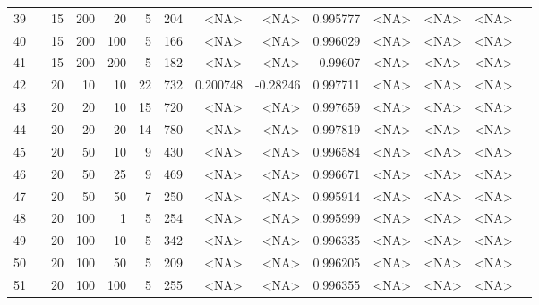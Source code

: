 \begin{longtable}{llrrrrrrrrrrrr}
		39  & &           15 &               200 &           20 &              5 &        204 &      <NA> &      <NA> &  0.995777 &        <NA> &           <NA> &      <NA> \\
		40  & &           15 &               200 &          100 &              5 &        166 &      <NA> &      <NA> &  0.996029 &        <NA> &           <NA> &      <NA> \\
		41  & &           15 &               200 &          200 &              5 &        182 &      <NA> &      <NA> &   0.99607 &        <NA> &           <NA> &      <NA> \\
		42  & &           20 &                10 &           10 &          22 &        732 &  0.200748 &  -0.28246 &  0.997711 &        <NA> &           <NA> &      <NA> \\
		43  & &           20 &                20 &           10 &             15 &        720 &      <NA> &      <NA> &  0.997659 &        <NA> &           <NA> &      <NA> \\
		44  & &           20 &                20 &           20 &             14 &        780 &      <NA> &      <NA> &  0.997819 &        <NA> &           <NA> &      <NA> \\
		45  & &           20 &                50 &           10 &              9 &        430 &      <NA> &      <NA> &  0.996584 &        <NA> &           <NA> &      <NA> \\
		46  & &           20 &                50 &           25 &              9 &        469 &      <NA> &      <NA> &  0.996671 &        <NA> &           <NA> &      <NA> \\
		47  & &           20 &                50 &           50 &              7 &        250 &      <NA> &      <NA> &  0.995914 &        <NA> &           <NA> &      <NA> \\
		48  & &           20 &               100 &            1 &              5 &        254 &      <NA> &      <NA> &  0.995999 &        <NA> &           <NA> &      <NA> \\
		49  & &           20 &               100 &           10 &              5 &        342 &      <NA> &      <NA> &  0.996335 &        <NA> &           <NA> &      <NA> \\
		50  & &           20 &               100 &           50 &              5 &        209 &      <NA> &      <NA> &  0.996205 &        <NA> &           <NA> &      <NA> \\
		51  & &           20 &               100 &          100 &              5 &        255 &      <NA> &      <NA> &  0.996355 &        <NA> &           <NA> &      <NA> \\

\end{longtable}

